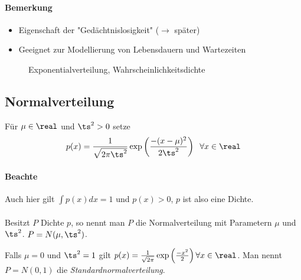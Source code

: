 \paragraph{Bemerkung}
\begin{itemize}
    \item Eigenschaft der "Gedächtnislosigkeit" ($\to$ später)
    \item Geeignet zur Modellierung von Lebensdauern und Wartezeiten
\end{itemize}

\begin{figure}[H]
    \centering
    \caption{Exponentialverteilung, Wahrscheinlichkeitsdichte}
\end{figure}

\subsection{Normalverteilung}
Für $\mu \in \real$ und $\ts^2 > 0$ setze
\begin{equation*}
    p(x) = \frac{1}{\sqrt{2 \pi \ts^2}} \exp\left( \frac{-(x-\mu)^2}{2 \ts^2} \right) \;\; \forall x\in\real
\end{equation*}

\paragraph{Beachte}
Auch hier gilt $\int p(x) dx = 1$ und $p(x) > 0$, $p$ ist also eine Dichte.
\\
\\
\noindent
Besitzt $P$ Dichte $p$, so nennt man $P$ die Normalverteilung mit Parametern
$\mu$ und $\ts^2$. $P=N(\mu, \ts^2)$.

Falls $\mu = 0$ und $\ts^2 = 1$ gilt $p(x) = \frac{1}{\sqrt{2 \pi}} \exp\left(\frac{-x^2}{2}\right) \forall x\in\real$.
Man nennt $P=N(0,1)$ die \emph{Standardnormalverteilung}.

